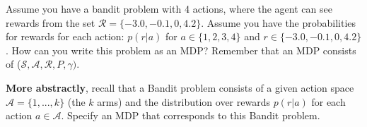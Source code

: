 Assume you have a bandit problem with 4 actions, where the agent can see rewards from the set $\mathcal{R} = \{-3.0, -0.1, 0, 4.2\}$. Assume you have the probabilities for rewards for each action: $p(r | a)$ for $a \in \{1, 2, 3, 4\}$ and $r \in \{-3.0, -0.1, 0, 4.2\}$. How can you write this problem as an MDP? Remember that an MDP consists of ($\mathcal{S}, \mathcal{A}, \mathcal{R}, P, \gamma)$. 
 
\textbf{More abstractly}, recall that a Bandit problem consists of a given action space $\mathcal{A} = \{1, ..., k\}$ (the $k$ arms) and the distribution over rewards $p(r | a)$ for each action $a \in \mathcal{A}$. Specify an MDP that corresponds to this Bandit problem. 
%
\smallspace

